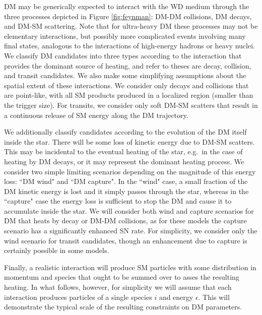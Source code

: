 \documentclass[twocolumn,preprintnumbers,amsmath,amssymb,prd, superscriptaddress]{revtex4} %
\begin{document}
DM may be generically expected to interact with the WD medium through the three processes depicted in Figure \ref{fig:feynman}: DM-DM collisions, DM decays, and DM-SM scattering.
Note that for ultra-heavy DM these processes may not be elementary interactions, but possibly more complicated events involving many final states, analogous to the interactions of high-energy hadrons or heavy nuclei.
We classify DM candidates into three types according to the interaction that provides the dominant source of heating, and refer to theses are decay, collision, and transit candidates.
We also make some simplifying assumptions about the spatial extent of these interactions.
We consider only decays and collisions that are point-like, with all SM products produced in a localized region (smaller than the trigger size).
For transits, we consider only soft DM-SM scatters that result in a continuous release of SM energy along the DM trajectory.

We additionally classify candidates according to the evolution of the DM itself inside the star.
There will be some loss of kinetic energy due to DM-SM scatters.
This may be incidental to the eventual heating of the star, e.g.~in the case of heating by DM decays, or it may represent the dominant heating process.
We consider two simple limiting scenarios depending on the magnitude of this energy loss: ``DM wind" and ``DM capture".
In the ``wind" case, a small fraction of the DM kinetic energy is lost and it simply passes through the star, whereas in the ``capture" case the energy loss is sufficient to stop the DM and cause it to accumulate inside the star.
We will consider both wind and capture scenarios for DM that heats by decay or DM-DM collisions, as for these models the capture scenario has a significantly enhanced SN rate.
For simplicity, we consider only the wind scenario for transit candidates, though an enhancement due to capture is certainly possible in some models.

Finally, a realistic interaction will produce SM particles with some distribution in momentum and species that ought to be summed over to asses the resulting heating.
In what follows, however, for simplicity we will assume that each interaction produces particles of a single species $i$ and energy $\epsilon$.
This will demonstrate the typical scale of the resulting constraints on DM parameters.
\end{document}
